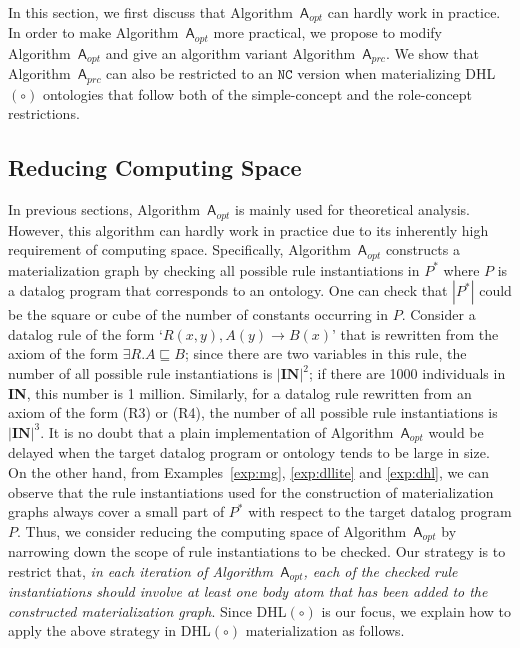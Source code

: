 \documentclass[final,1p,times]{elsarticle}
\begin{document}
In this section, we first discuss that Algorithm~$\mathsf{A}_{opt}$ can hardly work in practice.
In order to make Algorithm~$\mathsf{A}_{opt}$ more practical,
we propose to modify Algorithm~$\mathsf{A}_{opt}$ and give an algorithm variant Algorithm~$\mathsf{A}_{prc}$.
We show that Algorithm~$\mathsf{A}_{prc}$ can also be restricted to an $\texttt{NC}$ version
when materializing DHL$(\circ)$ ontologies that follow both of the simple-concept
and the role-concept restrictions.

\subsection{Reducing Computing Space}

In previous sections, Algorithm~$\mathsf{A}_{opt}$ is mainly used for theoretical analysis.
However, this algorithm can hardly work in practice due to its inherently
high requirement of computing space. Specifically,
Algorithm~$\mathsf{A}_{opt}$ constructs a materialization graph by checking all possible rule
instantiations in $P^*$ where $P$ is a datalog program that corresponds to an ontology.
One can check that $|P^*|$ could be the square or cube of the number of constants occurring in $P$.
Consider a datalog rule of the form `$R(x,y),A(y)\rightarrow B(x)$'
that is rewritten from the axiom of the form $\exists R.A\sqsubseteq B$;
since there are two variables in this rule, the number of all possible rule instantiations
is $|\textbf{IN}|^2$; if there are
1000 individuals in \textbf{IN}, this number is 1 million.
Similarly, for a datalog rule rewritten from an axiom of the form (R3) or (R4),
the number of all possible rule instantiations is $|\textbf{IN}|^3$.
It is no doubt that a plain implementation of Algorithm~$\mathsf{A}_{opt}$ would be delayed
when the target datalog program or ontology
tends to be large in size.
On the other hand, from Examples~\ref{exp:mg}, \ref{exp:dllite} and \ref{exp:dhl},
we can observe that the rule instantiations used for the construction
of materialization graphs always cover a small part of $P^*$ with respect to the target datalog program $P$.
Thus, we consider reducing the computing space of Algorithm~$\mathsf{A}_{opt}$
by narrowing down the scope of rule instantiations to be checked.
Our strategy is to restrict that, \emph{in each iteration of Algorithm~$\mathsf{A}_{opt}$,
each of the checked rule instantiations should involve at least one body atom that has been
added to the constructed materialization graph}.
Since DHL$(\circ)$
is our focus, we explain how to apply the above strategy in DHL$(\circ)$ materialization
as follows.
\end{document}
